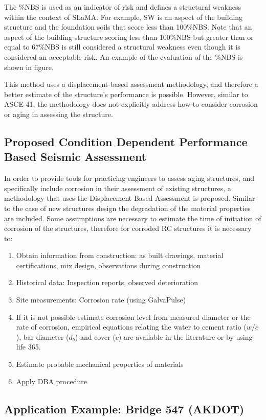 The \%NBS is used as an indicator of risk and defines a structural weakness within the context of SLaMA. For example, SW is an aspect of the building structure and the foundation soils that score less than 100\%NBS. Note that an aspect of the building structure scoring less than 100\%NBS but greater than or equal to 67\%NBS is still considered a structural weakness even though it is considered an acceptable risk. An example of the evaluation of the \%NBS is shown in figure.

This method uses a displacement-based assessment methodology, and therefore a better estimate of the structure's performance is possible. However, similar to ASCE 41, the methodology does not explicitly address how to consider corrosion or aging in assessing the structure.

\subsection{Proposed Condition Dependent Performance Based Seismic Assessment}

In order to provide tools for practicing engineers to assess aging structures, and specifically include corrosion in their assessment of existing structures, a methodology that uses the Displacement Based Assessment is proposed. Similar to the case of new structures design the degradation of the material properties are included. Some assumptions are necessary to estimate the time of initiation of corrosion of the structures, therefore for corroded RC structures it is necessary to:

\begin{enumerate}
    \item Obtain information from construction: as built drawings, material certifications, mix design, observations during construction
    \item Historical data: Inspection reports, observed deterioration
    \item Site measurements: Corrosion rate (using GalvaPulse)
    \item If it is not possible estimate corrosion level from measured diameter or the rate of corrosion, empirical equations relating the water to cement ratio ($w/c$), bar diameter ($d_{b}$) and cover ($c$) are available in the literature or by using life 365.
    \item Estimate probable mechanical properties of materials
    \item Apply DBA procedure
\end{enumerate}

\subsection{Application Example: Bridge 547 (AKDOT)}
